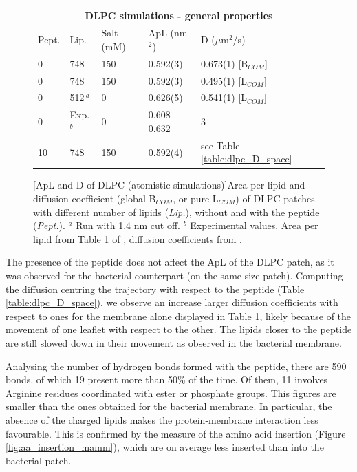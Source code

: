 \begin{figure}[t!]
\centering
 \def\arraystretch{1.6}
\begin{tabular}{lllll}
\multicolumn{5}{c}{\textbf{DLPC simulations - general properties}} \\
\hline
Pept. & Lip. & Salt (mM) & ApL (nm$^2$) & D ($\mu$m$^2$/s) \\
\hline
0 & 748 & 150 & 0.592(3) & 0.673(1) [B$_{COM}$] \\
0 & 748 & 150 & 0.592(3) & 0.495(1) [L$_{COM}$] \\
0 & 512$\,^a$ & 0 & 0.626(5) & 0.541(1) [L$_{COM}$] \\
\cline{2-5}
0 & Exp.$^b$ & 0 & 0.608-0.632 & 3 \\
\hline
10 & 748 & 150 & 0.592(4) & see Table \ref{table:dlpc_D_space} \\
\hline
 \end{tabular}
[ApL and D of DLPC (atomistic simulations)]{Area per lipid and diffusion coefficient (global B$_{COM}$, or pure L$_{COM}$) of DLPC patches with different number of lipids (\emph{Lip.}), without and with the peptide (\emph{Pept.}). $^a$ Run with 1.4 nm cut off. $^b$ Experimental values. Area per lipid from Table 1 of \citet{Poger2016}, diffusion coefficients from \citet{Lindblom2009}.}
\label{table:dlpc_apl}
\end{figure}

The presence of the peptide does not affect the ApL of the DLPC patch, as it was observed for the bacterial counterpart (on the same size patch). Computing the diffusion centring the trajectory with respect to the peptide (Table \ref{table:dlpc_D_space}), we observe an increase larger diffusion coefficients with respect to ones for the membrane alone displayed in Table \ref{table:dlpc_apl}, likely because of the movement of one leaflet with respect to the other. The lipids closer to the peptide are still slowed down in their movement as observed in the bacterial membrane.

Analysing the number of hydrogen bonds formed with the peptide, there are 590 bonds, of which 19 present more than 50\% of the time. Of them, 11 involves Arginine residues coordinated with ester or phosphate groups. This figures are smaller than the ones obtained for the bacterial membrane. In particular, the absence of the charged lipids makes the protein-membrane interaction less favourable. This is confirmed by the measure of the amino acid insertion (Figure \ref{fig:aa_insertion_mamm}), which are on average less inserted than into the bacterial patch.

